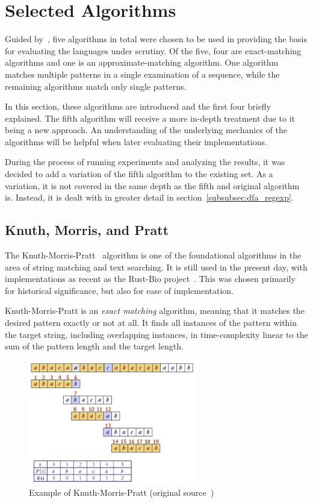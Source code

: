 \section{Selected Algorithms}
\label{sec:algorithms}

Guided by~\cite{rahate}, five algorithms in total were chosen to be used in providing the basis for evaluating the languages under scrutiny. Of the five, four are exact-matching algorithms and one is an approximate-matching algorithm. One algorithm matches multiple patterns in a single examination of a sequence, while the remaining algorithms match only single patterns.

In this section, these algorithms are introduced and the first four briefly explained. The fifth algorithm will receive a more in-depth treatment due to it being a new approach. An understanding of the underlying mechanics of the algorithms will be helpful when later evaluating their implementations.

During the process of running experiments and analyzing the results, it was decided to add a variation of the fifth algorithm to the existing set. As a variation, it is not covered in the same depth as the fifth and original algorithm is. Instead, it is dealt with in greater detail in section~\ref{subsubsec:dfa_regexp}.

\subsection{Knuth, Morris, and Pratt}

The Knuth-Morris-Pratt~\cite{knuth} algorithm is one of the foundational algorithms in the area of string matching and text searching. It is still used in the present day, with implementations as recent as the Rust-Bio project~\cite{rust}. This was chosen primarily for historical significance, but also for ease of implementation.

Knuth-Morris-Pratt is an \textit{exact matching} algorithm, meaning that it matches the desired pattern exactly or not at all. It finds all instances of the pattern within the target string, including overlapping instances, in time-complexity linear to the sum of the pattern length and the target length.

\begin{figure}[ht]
    \centering
    \includegraphics[width=0.65\textwidth]{figures/kmpexample.jpg}
    \caption[Example of Knuth-Morris-Pratt algorithm]{Example of Knuth-Morris-Pratt (original source~\cite{shandilya})}
    \label{fig:image:kmpexample}
\end{figure}

